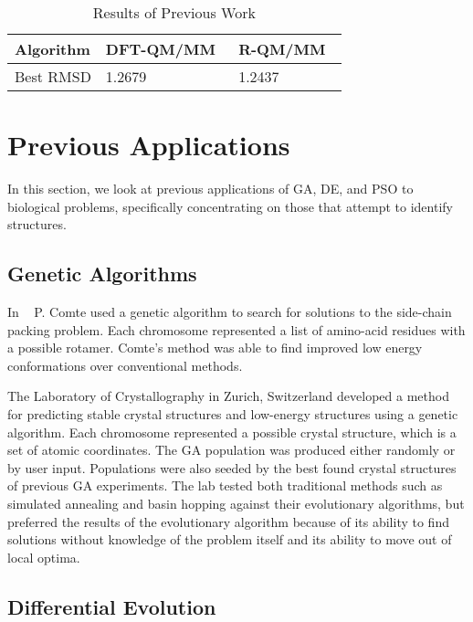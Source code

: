 \begin{table}
	\centering
	\begin{tabular}{ | l | l | l | }
		\hline
		Algorithm & DFT-QM/MM~\cite{luber2011s1} & R-QM/MM~\cite{luber2011s1} \\ \hline
		Best RMSD & 1.2679 & 1.2437 \\ \hline
	\end{tabular}
	\caption{Results of Previous Work}
	\label{fig:previous-work-rmsd}
\end{table}

\section{Previous Applications}
\label{sec:prev-app}

In this section, we look at previous applications of GA, DE, and PSO to biological problems, specifically concentrating on those that attempt to identify structures.

\subsection{Genetic Algorithms}

In ~\cite{comte2010bio} P. Comte used a genetic algorithm to search for solutions to the side-chain packing problem. Each chromosome represented a list of amino-acid residues with a possible rotamer. Comte's method was able to find improved low energy conformations over conventional methods.

The Laboratory of Crystallography in Zurich, Switzerland developed a method~\cite{oganov2006crystal} for predicting stable crystal structures and low-energy structures using a genetic algorithm. Each chromosome represented a possible crystal structure, which is a set of atomic coordinates. The GA population was produced either randomly or by user input. Populations were also seeded by the best found crystal structures of previous GA experiments. The lab tested both traditional methods such as simulated annealing and basin hopping against their evolutionary algorithms, but preferred the results of the evolutionary algorithm because of its ability to find solutions without knowledge of the problem itself and its ability to move out of local optima.

\subsection{Differential Evolution}

